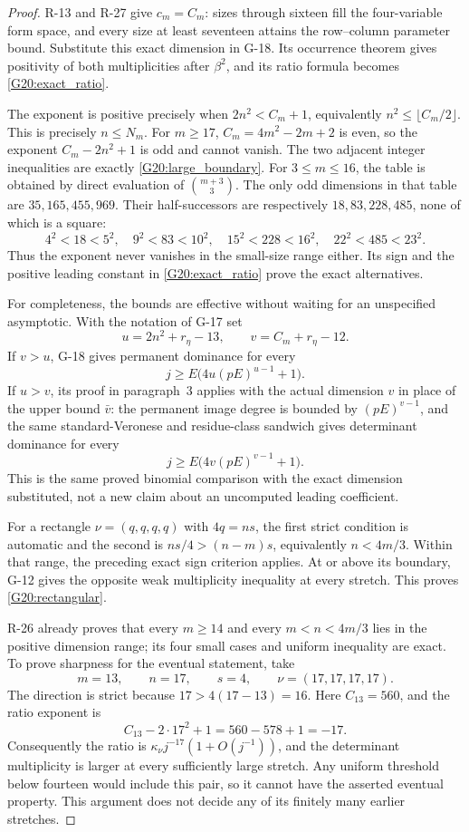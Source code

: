 \begin{proof}
R-13 and R-27 give $c_m=C_m$: sizes through sixteen fill the
four-variable form space, and every size at least seventeen
attains the row--column parameter bound. Substitute this exact
dimension in G-18. Its occurrence theorem gives positivity
of both multiplicities after $\beta^2$, and its ratio formula
becomes \eqref{G20:exact_ratio}.

The exponent is positive precisely when
$2n^2<C_m+1$, equivalently
$n^2\le\lfloor C_m/2\rfloor$. This is precisely $n\le N_m$.
For $m\ge17$, $C_m=4m^2-2m+2$ is even, so the exponent
$C_m-2n^2+1$ is odd and cannot vanish. The two adjacent integer
inequalities are exactly \eqref{G20:large_boundary}.
For $3\le m\le16$, the table is obtained by direct evaluation
of $\binom{m+3}{3}$. The only odd dimensions in that table are
$35,165,455,969$. Their half-successors are respectively
$18,83,228,485$, none of which is a square:
\[
 4^2<18<5^2,\quad9^2<83<10^2,\quad
 15^2<228<16^2,\quad22^2<485<23^2.
\]
Thus the exponent never vanishes in the small-size range
either. Its sign and the positive leading constant in
\eqref{G20:exact_ratio} prove the exact alternatives.

For completeness, the bounds are effective without waiting
for an unspecified asymptotic. With the notation of G-17 set
\[
 u=2n^2+r_\eta-13,\qquad v=C_m+r_\eta-12.
\]
If $v>u$, G-18 gives permanent dominance for every
\[
 j\ge E\bigl(4u(pE)^{u-1}+1\bigr).
\]
If $u>v$, its proof in paragraph~3 applies with the actual
dimension $v$ in place of the upper bound $\bar v$: the
permanent image degree is bounded by $(pE)^{v-1}$, and the
same standard-Veronese and residue-class sandwich gives
determinant dominance for every
\[
 j\ge E\bigl(4v(pE)^{v-1}+1\bigr).
\]
This is the same proved binomial comparison with the exact
dimension substituted, not a new claim about an uncomputed
leading coefficient.

For a rectangle $\nu=(q,q,q,q)$ with $4q=ns$, the first
strict condition is automatic and the second is
$ns/4>(n-m)s$, equivalently $n<4m/3$.
Within that range, the preceding exact sign criterion applies.
At or above its boundary, G-12 gives the opposite weak
multiplicity inequality at every stretch. This proves
\eqref{G20:rectangular}.

R-26 already proves that every $m\ge14$ and every
$m<n<4m/3$ lies in the positive dimension range; its four
small cases and uniform inequality are exact. To prove
sharpness for the eventual statement, take
\[
 m=13,\qquad n=17,\qquad s=4,\qquad\nu=(17,17,17,17).
\]
The direction is strict because $17>4(17-13)=16$.
Here $C_{13}=560$, and the ratio exponent is
\[
 C_{13}-2\cdot17^2+1=560-578+1=-17.
\]
Consequently the ratio is $\kappa_\nu j^{-17}(1+O(j^{-1}))$,
and the determinant multiplicity is larger at every sufficiently
large stretch. Any uniform threshold below fourteen would
include this pair, so it cannot have the asserted eventual
property. This argument does not decide any of its finitely
many earlier stretches.
\end{proof}

